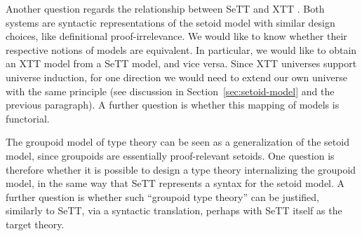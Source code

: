 \documentclass[a4paper,UKenglish,cleveref, autoref, thm-restate]{lipics-v2019}
\begin{document}
Another question regards the relationship between SeTT \cite{mpc19} and XTT
\cite{xtt}. Both systems are syntactic representations of the setoid model with
similar design choices, like definitional proof-irrelevance. We would like to
know whether their respective notions of models are equivalent.
In particular, we would like to obtain an XTT model from a SeTT model, and vice versa. Since XTT
universes support universe induction, for one direction we would need to
extend our own universe with the same principle (see discussion in
Section~\ref{sec:setoid-model} and the previous paragraph). A further question is
whether this mapping of models is functorial.

The groupoid model of type theory \cite{groupoid} can be seen as a
generalization of the setoid model, since groupoids are essentially
proof-relevant setoids.
%
One question is therefore whether it is possible to design a type theory
internalizing the groupoid model, in the same way that SeTT represents a syntax
for the setoid model. A further question is whether such ``groupoid type
theory'' can be justified, similarly to SeTT, via a syntactic translation,
perhaps with SeTT itself as the target theory.


\end{document}

